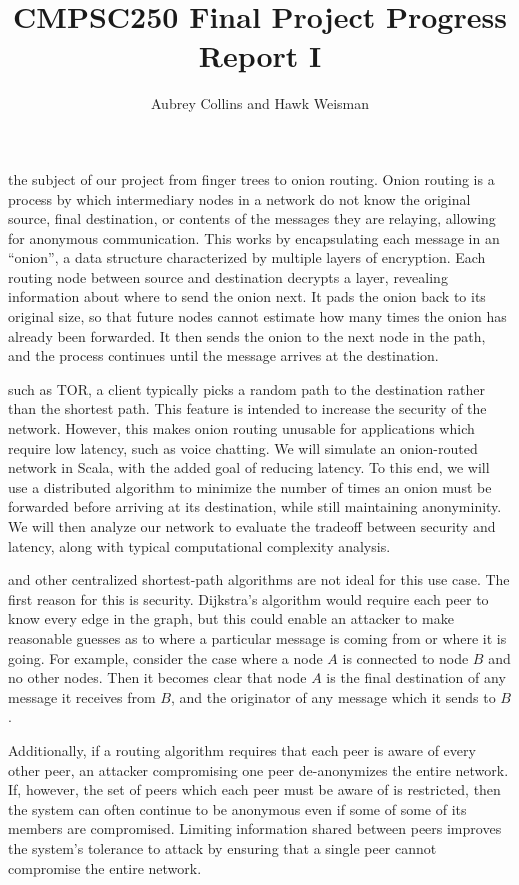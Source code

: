 \documentclass[a4paper,nobib]{tufte-handout}
\title{CMPSC250 Final Project Progress Report I}
\author{Aubrey Collins and Hawk Weisman}
\begin{document}
\maketitle

 the subject of our project from finger trees to onion routing. Onion routing is a process by which intermediary nodes in a network do not know the original source, final destination, or contents of the messages they are relaying, allowing for anonymous communication. This works by encapsulating each message in an ``onion'', a data structure characterized by multiple layers of encryption. Each routing node between source and destination decrypts a layer, revealing information about where to send the onion next. It pads the onion back to its original size, so that future nodes cannot estimate how many times the onion has already been forwarded. It then sends the onion to the next node in the path, and the process continues until the message arrives at the destination.

 such as TOR, a client typically picks a random path to the destination rather than the shortest path. This feature is intended to increase the security of the network. However, this makes onion routing unusable for applications which require low latency, such as voice chatting. We will simulate an onion-routed network in Scala, with the added goal of reducing latency. To this end, we will use a distributed algorithm to minimize the number of times an onion must be forwarded before arriving at its destination, while still maintaining anonyminity. We will then analyze our network to evaluate the tradeoff between security and latency, along with typical computational complexity analysis.


 and other centralized shortest-path algorithms are not ideal for this use case. The first reason for this is security. Dijkstra's algorithm would require each peer to know every edge in the graph, but this could enable an attacker to make reasonable guesses as to where a particular message is coming from or where it is going. For example, consider the case where a node $A$ is connected to node $B$ and no other nodes. Then it becomes clear that node $A$ is the final destination of any message it receives from $B$, and the originator of any message which it sends to $B$.

Additionally, if a routing algorithm requires that each peer is aware of every other peer, an attacker compromising one peer de-anonymizes the entire network. If, however, the set of peers which each peer must be aware of is restricted,  then the system can often continue to be anonymous even if some of some of its members are compromised. Limiting information shared between peers improves the system's tolerance to attack by ensuring that a single peer cannot compromise the entire network.
\end{document}
